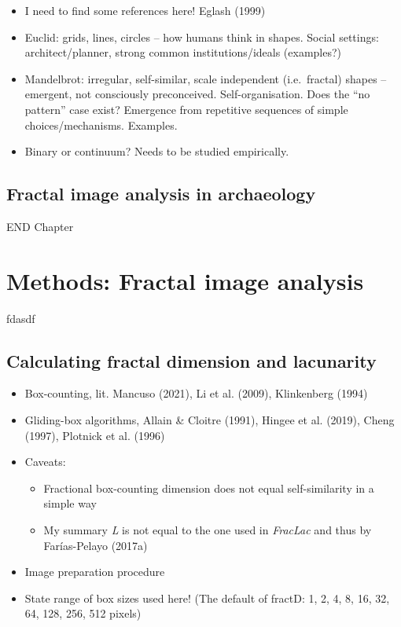 \documentclass[
  12pt,
]{book}
\begin{document}
\begin{itemize}
\item
  I need to find some references here! Eglash (1999)
\item
  Euclid: grids, lines, circles -- how humans think in shapes. Social settings: architect/planner, strong common institutions/ideals (examples?)
\item
  Mandelbrot: irregular, self-similar, scale independent (i.e.~fractal) shapes -- emergent, not consciously preconceived. Self-organisation. Does the ``no pattern'' case exist? Emergence from repetitive sequences of simple choices/mechanisms. Examples.
\item
  Binary or continuum? Needs to be studied empirically.
\end{itemize}

\hypertarget{image-archaeo}{%
\section{Fractal image analysis in archaeology}\label{image-archaeo}}

END Chapter

\hypertarget{images-methods}{%
\chapter{Methods: Fractal image analysis}\label{images-methods}}

fdasdf

\hypertarget{images-procedure}{%
\section{Calculating fractal dimension and lacunarity}\label{images-procedure}}

\begin{itemize}
\item
  Box-counting, lit. Mancuso (2021), Li et al. (2009), Klinkenberg (1994)
\item
  Gliding-box algorithms, Allain \& Cloitre (1991), Hingee et al. (2019), Cheng (1997), Plotnick et al. (1996)
\item
  Caveats:

  \begin{itemize}
  \item
    Fractional box-counting dimension does not equal self-similarity in a simple way
  \item
    My summary \emph{L} is not equal to the one used in \emph{FracLac} and thus by Farías-Pelayo (2017a)
  \end{itemize}
\item
  Image preparation procedure
\item
  State range of box sizes used here! (The default of fractD: 1, 2, 4, 8, 16, 32, 64, 128, 256, 512 pixels)
\end{itemize}
\end{document}
